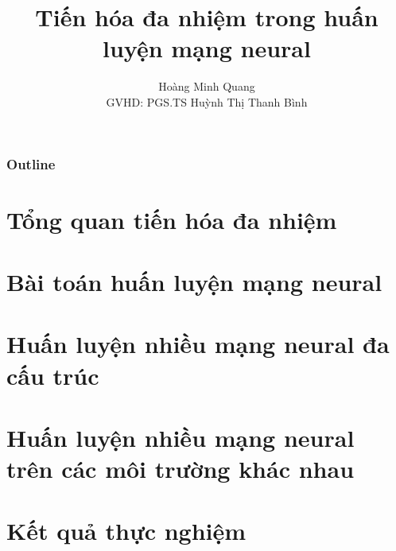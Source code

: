 \documentclass[pdf,10pt]{beamer}
\title{Tiến hóa đa nhiệm trong huấn luyện mạng neural}
\author[Hoàng Minh Quang]{Hoàng Minh Quang\\[1ex]  \small GVHD: PGS.TS Huỳnh Thị Thanh Bình}
\begin{document}
	\setlength\itemsep{0.03em}
	\begin{frame}
	    \titlepage
	\end{frame}

	\begin{frame}
	    \frametitle{Outline}
	    \tableofcontents
	\end{frame}
    \section{Tổng quan tiến hóa đa nhiệm}
    
    \section{Bài toán huấn luyện mạng neural}
    
    \section{Huấn luyện nhiều mạng neural đa cấu trúc}
    
    \section{Huấn luyện nhiều mạng neural trên các môi trường khác nhau}
    
    \section{Kết quả thực nghiệm}
    
	
\end{document}
